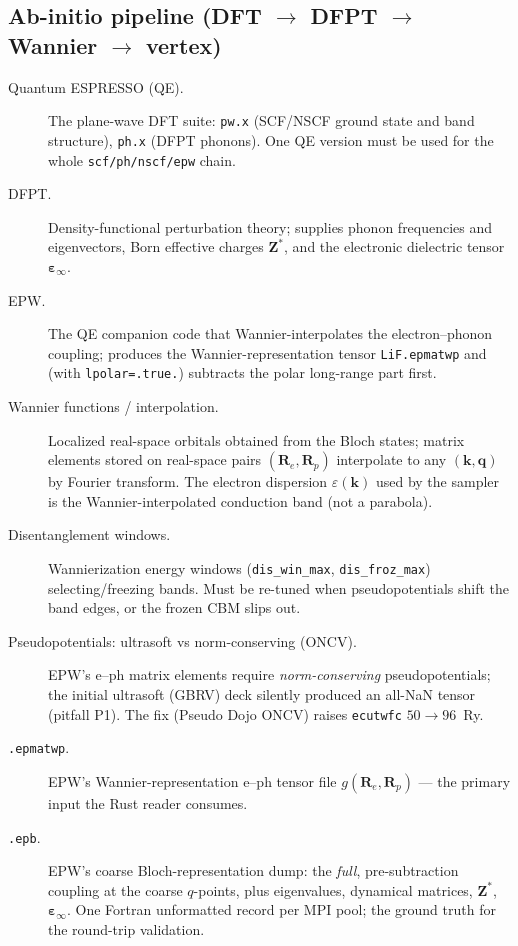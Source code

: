 \documentclass[11pt]{article}
\newcommand{\kv}{\mathbf{k}}
\newcommand{\qv}{\mathbf{q}}
\newcommand{\term}[1]{\item[#1.]}
\begin{document}
\subsection{Ab-initio pipeline (DFT $\to$ DFPT $\to$ Wannier $\to$ vertex)}

\begin{description}
\term{Quantum ESPRESSO (QE)} The plane-wave DFT suite: \texttt{pw.x} (SCF/NSCF
  ground state and band structure), \texttt{ph.x} (DFPT phonons). One QE version must
  be used for the whole \texttt{scf/ph/nscf/epw} chain.

\term{DFPT} Density-functional perturbation theory; supplies phonon frequencies and
  eigenvectors, Born effective charges $\mathbf{Z}^{*}$, and the electronic dielectric
  tensor $\bm\varepsilon_{\infty}$.

\term{EPW} The QE companion code that Wannier-interpolates the electron--phonon
  coupling; produces the Wannier-representation tensor \texttt{LiF.epmatwp} and (with
  \texttt{lpolar=.true.}) subtracts the polar long-range part first.

\term{Wannier functions / interpolation} Localized real-space orbitals obtained from
  the Bloch states; matrix elements stored on real-space pairs $(\mathbf{R}_{e},
  \mathbf{R}_{p})$ interpolate to any $(\kv,\qv)$ by Fourier transform. The electron
  dispersion $\varepsilon(\kv)$ used by the sampler is the Wannier-interpolated
  conduction band (not a parabola).

\term{Disentanglement windows} Wannierization energy windows
  (\texttt{dis\_win\_max}, \texttt{dis\_froz\_max}) selecting/freezing bands. Must be
  re-tuned when pseudopotentials shift the band edges, or the frozen CBM slips out.

\term{Pseudopotentials: ultrasoft vs norm-conserving (ONCV)} EPW's e--ph matrix
  elements require \emph{norm-conserving} pseudopotentials; the initial ultrasoft
  (GBRV) deck silently produced an all-NaN tensor (pitfall P1). The fix (Pseudo Dojo
  ONCV) raises \texttt{ecutwfc} $50\to96$~Ry.

\term{\texttt{.epmatwp}} EPW's Wannier-representation e--ph tensor file
  $g(\mathbf{R}_{e},\mathbf{R}_{p})$ --- the primary input the Rust reader consumes.

\term{\texttt{.epb}} EPW's coarse Bloch-representation dump: the \emph{full},
  pre-subtraction coupling at the coarse $q$-points, plus eigenvalues, dynamical
  matrices, $\mathbf{Z}^{*}$, $\bm\varepsilon_{\infty}$. One Fortran unformatted
  record per MPI pool; the ground truth for the round-trip validation.


\end{description}
\end{document}
